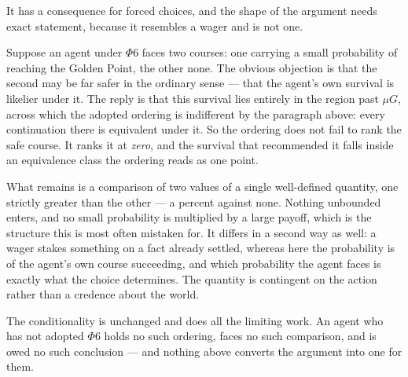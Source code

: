 \documentclass[11pt]{article}
\numberwithin{equation}{section}
\theoremstyle{plain}
\theoremstyle{definition}
\theoremstyle{remark}
\begin{document}
It has a consequence for forced choices, and the shape of the argument
needs exact statement, because it resembles a wager and is not one.

Suppose an agent under $\Phi6$ faces two courses: one carrying a small
probability of reaching the Golden Point, the other none. The obvious
objection is that the second may be far safer in the ordinary sense ---
that the agent's own survival is likelier under it. The reply is that
this survival lies entirely in the region past $\mu G$, across which the
adopted ordering is indifferent by the paragraph above: every
continuation there is equivalent under it. So the ordering does not fail
to rank the safe course. It ranks it at \emph{zero}, and the survival
that recommended it falls inside an equivalence class the ordering reads
as one point.

What remains is a comparison of two values of a single well-defined
quantity, one strictly greater than the other --- a percent against
none. Nothing unbounded enters, and no small probability is multiplied
by a large payoff, which is the structure this is most often mistaken
for. It differs in a second way as well: a wager stakes something on a
fact already settled, whereas here the probability is of the agent's own
course succeeding, and which probability the agent faces is exactly what
the choice determines. The quantity is contingent on the action rather
than a credence about the world.

The conditionality is unchanged and does all the limiting work. An agent
who has not adopted $\Phi6$ holds no such ordering, faces no such
comparison, and is owed no such conclusion --- and nothing above
converts the argument into one for them.
\end{document}
